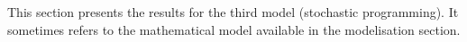 This section presents the results for the third model (stochastic programming). It sometimes refers to the mathematical model available in the modelisation section.